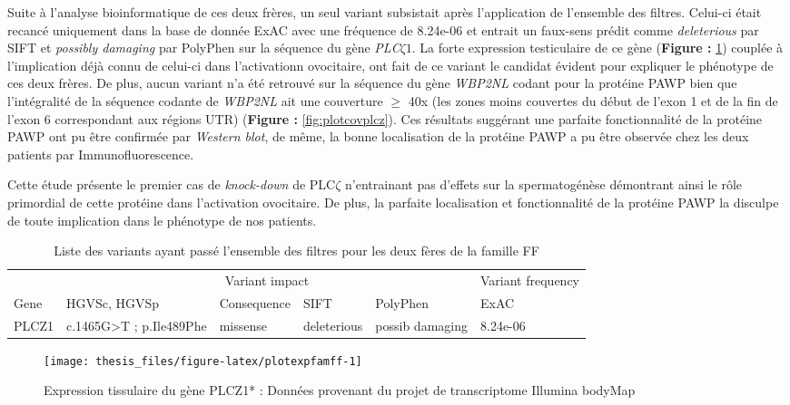\documentclass[12pt,twoside]{reedthesis}
\theoremstyle{definition}
\theoremstyle{definition}
\theoremstyle{remark}
\begin{document}
  Suite à l'analyse bioinformatique de ces deux frères, un seul variant
  subsistait après l'application de l'ensemble des filtres. Celui-ci était
  recancé uniquement dans la base de donnée ExAC avec une fréquence de
  8.24e-06 et entrait un faux-sens prédit comme \emph{deleterious} par
  SIFT et \emph{possibly damaging} par PolyPhen sur la séquence du gène
  \emph{PLC}\(\zeta 1\). La forte expression testiculaire de ce gène
  (\textbf{Figure : }\ref{fig:plotexpfamff}) couplée à l'implication déjà
  connu de celui-ci dans l'activationn ovocitaire, ont fait de ce variant
  le candidat évident pour expliquer le phénotype de ces deux frères. De
  plus, aucun variant n'a été retrouvé sur la séquence du gène
  \emph{WBP2NL} codant pour la protéine PAWP bien que l'intégralité de la
  séquence codante de \emph{WBP2NL} ait une couverture \(\ge\) 40x (les
  zones moins couvertes du début de l'exon 1 et de la fin de l'exon 6
  correspondant aux régions UTR) (\textbf{Figure :
  }\ref{fig:plotcovplcz}). Ces résultats suggérant une parfaite
  fonctionnalité de la protéine PAWP ont pu être confirmée par
  \emph{Western blot}, de même, la bonne localisation de la protéine PAWP
  a pu être observée chez les deux patients par Immunofluorescence.
  
  Cette étude présente le premier cas de \emph{knock-down} de PLC\(\zeta\)
  n'entrainant pas d'effets sur la spermatogénèse démontrant ainsi le rôle
  primordial de cette protéine dans l'activation ovocitaire. De plus, la
  parfaite localisation et fonctionnalité de la protéine PAWP la disculpe
  de toute implication dans le phénotype de nos patients.
  
  \begin{longtable}[t]{llllll}
  \caption{\label{tab:tabrecapff}Liste des variants ayant passé l'ensemble des filtres pour les deux fères de la famille FF}\\
  \toprule
  \multicolumn{1}{c}{ } & \multicolumn{4}{c}{Variant impact} & \multicolumn{1}{c}{Variant frequency} \\
  \cmidrule(l{2pt}r{2pt}){2-5} \cmidrule(l{2pt}r{2pt}){6-6}
  Gene & HGVSc, HGVSp & Consequence & SIFT & PolyPhen & ExAC\\
  \midrule
  PLCZ1 & c.1465G>T ; p.Ile489Phe & missense & deleterious & possib damaging & 8.24e-06\\
  \bottomrule
  \end{longtable}
  
  \newpage
  
  \begin{figure}
  
  {\centering \texttt{[image: thesis\_files/figure-latex/plotexpfamff-1]} 
  
  }
  
  \caption[Expression tissulaire du gène PLCZ1*]{Expression tissulaire du gène PLCZ1* : Données provenant du projet de transcriptome Illumina bodyMap}\label{fig:plotexpfamff}
  \end{figure}
  
\end{document}
